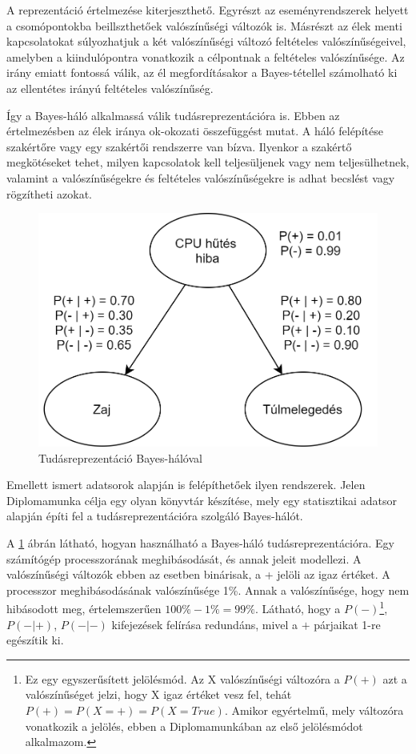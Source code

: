 A reprezentáció értelmezése kiterjeszthető. Egyrészt az eseményrendszerek helyett a csomópontokba beillszthetőek valószínűségi változók is. Másrészt az élek menti kapcsolatokat súlyozhatjuk a két valószínűségi változó feltételes valószínűségeivel, amelyben a kiindulópontra vonatkozik a célpontnak a feltételes valószínűsége. Az irány emiatt fontossá válik, az él megfordításakor a Bayes-tétellel számolható ki az ellentétes irányú feltételes valószínűség.

Így a Bayes-háló alkalmassá válik tudásreprezentációra is. Ebben az értelmezésben az élek iránya ok-okozati összefüggést mutat. A háló felépítése szakértőre vagy egy szakértői rendszerre van bízva. Ilyenkor a szakértő megkötéseket tehet, milyen kapcsolatok kell teljesüljenek vagy nem teljesülhetnek, valamint a valószínűségekre és feltételes valószínűségekre is adhat becslést vagy rögzítheti azokat.

\begin{figure}[htp]
    \centering
    \includegraphics[width=12cm]{figures/BayesianNetwork.png}
    \caption{Tudásreprezentáció Bayes-hálóval}
    \label{fig:bayes-halo-tudasrep}
\end{figure}

Emellett ismert adatsorok alapján is felépíthetőek ilyen rendszerek. Jelen Diplomamunka célja egy olyan könyvtár készítése, mely egy statisztikai adatsor alapján építi fel a tudásreprezentációra szolgáló Bayes-hálót.

A \ref{fig:bayes-halo-tudasrep} ábrán látható, hogyan használható a Bayes-háló tudásreprezentációra. Egy számítógép processzorának meghibásodását, és annak jeleit modellezi. A valószínűségi változók ebben az esetben binárisak, a + jelöli az igaz értéket. A processzor meghibásodásának valószínűsége 1\%. Annak a valószínűsége, hogy nem hibásodott meg, értelemszerűen $100\%-1\%=99\%$. Látható, hogy a $P(-)$\footnote{Ez egy egyszerűsített jelölésmód. Az X valószínűségi változóra a $P(+)$ azt a valószínűséget jelzi, hogy X igaz értéket vesz fel, tehát $P(+) = P(X=+) = P(X=True)$. Amikor egyértelmű, mely változóra vonatkozik a jelölés, ebben a Diplomamunkában az első jelölésmódot alkalmazom.}, $P(-|+)$, $P(-|-)$ kifejezések felírása redundáns, mivel a $+$ párjaikat 1-re egészítik ki.

